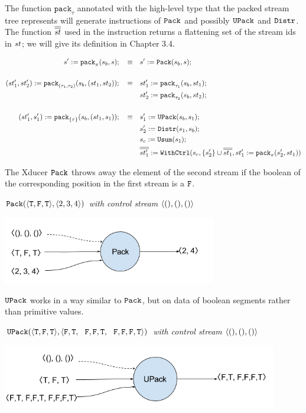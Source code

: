 The function $\mathtt{pack}_{\tau}$ annotated with the high-level type  that the packed stream tree represents will generate instructions of $\pack$ and possibly $\upack$ and $\distr$. The function $\olol{st}$  used in the instruction \wc returns a flattening set of the stream ids in $\st$; we will give its definition in Chapter 3.4.

\begin{align*}
s' := \Pack{s_b}{s}{\pi}; \quad \equiv & \quad s' := \packf{s_b}{s}; \\
\\
(st'_1,st'_2)  := \Pack{s_b}{(st_1,st_2)}{(\tau_1,\tau_2)}; \quad \equiv & \quad st_1' := \Pack{s_b}{st_1}{\tau_1}; \\ 
&\quad st_2' := \Pack{s_b}{st_2}{\tau_2};\\
\\
(st'_1,s_1')  := \Pack{s_b}{(st_1,s_1)}{\{\tau\}}; \quad \equiv & \quad s_1' := \upackf{s_b}{s_1}; \\ 
&\quad s_2' := \distrf{s_1}{s_b};\\
&\quad s_c := \usumf{s_1}; \\
&\quad \withctrl{s_c}{st_1' :=  \Pack{s_2'}{st_1}{\tau}}{\{s_2'\} \cup \olol{st_1}}{\olol{st'_1}} \\
\end{align*}



The Xducer $\pack$ throws away the element of the second stream if the boolean of the corresponding position in the first stream is a $\F$. 

\begin{example} \emph{$\pack({\<\T,\F,\T\'>}, \<2,3,4 \'>)$ with control stream $\< (),(), () \'>$}\\
	\begin{center}
		\includegraphics[width=0.7\textwidth]{fig/packxducer.png}
	\end{center}
\end{example}

$\upack$ works in a way similar to $\pack$, but on data of boolean segments rather than primitive values.
\begin{example} \emph{$\upack({\<\T,\F,\T\'>}, \< \F,\T,\ \ \F,\F,\T, \ \ \F,\F,\F, \T\'>)$ with control stream $\< (),(), () \'>$}\\
	\begin{center}
		\includegraphics[width=0.9\textwidth]{fig/upackxducer.png}
	\end{center}
\end{example}


